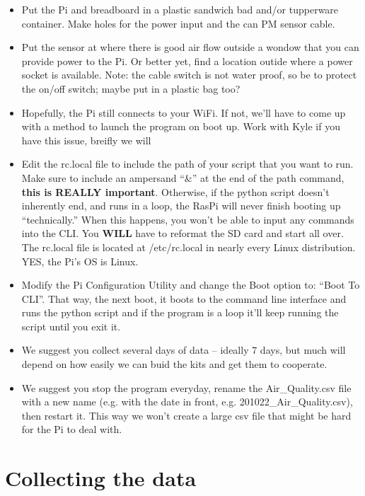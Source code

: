 \documentclass{article}\usepackage[]{graphicx}\usepackage[]{color}
\begin{document}
\begin{itemize}
  \item Put the Pi and breadboard in a plastic sandwich bad and/or tupperware container. Make holes for the power input and the can PM sensor cable. 
  \item Put the sensor at where there is good air flow outside a wondow that you can provide power to the Pi. Or better yet, find a location outide where a power socket is available.  Note: the cable switch is not water proof, so be to protect the on/off switch; maybe put in a plastic bag too?
  \item Hopefully, the Pi still connects to your WiFi. If not, we'll have to come up with a method to launch the program on boot up. Work with Kyle if you have this issue, breifly we will 
  
\item Edit the rc.local file to include the path of your script that you want to run. Make sure to include an ampersand ``\&'' at the end of the path command, \textbf{this is REALLY important}. Otherwise, if the python script doesn't inherently end, and runs in a loop, the RasPi will never finish booting up ``technically.'' When this happens, you won't be able to input any commands into the CLI. You \textbf{WILL} have to reformat the SD card and start all over. The rc.local file is located at /etc/rc.local in nearly every Linux distribution. YES, the Pi's OS is Linux.
  \item Modify the Pi Configuration Utility and change the Boot option to: ``Boot To CLI''. That way, the next boot, it boots to the command line interface and runs the python script and if the program is a loop it'll keep running the script until you exit it.
  

\item We suggest you collect several days of data -- ideally 7 days, but much will depend on how easily we can buid the kits and get them to cooperate. 
\item We suggest you stop the program everyday, rename the Air\_Quality.csv file with a new name (e.g. with the date in front, e.g. 201022\_Air\_Quality.csv), then restart it. This way we won't create a large csv file that might be hard for the Pi to deal with. 

\end{itemize}


\section{Collecting the data}
\end{document}
